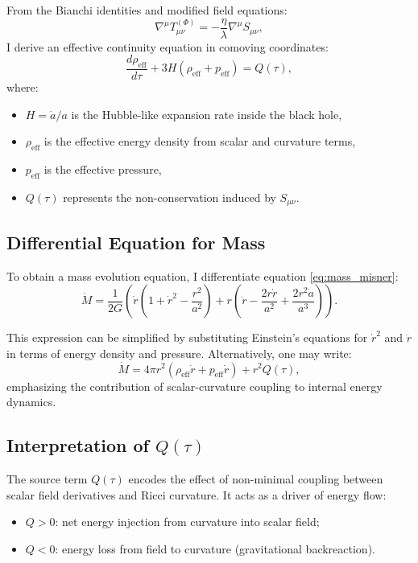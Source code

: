 \documentclass[12pt]{article}
\begin{document}
From the Bianchi identities and modified field equations:
\begin{equation}
\nabla^\mu T^{(\Phi)}_{\mu\nu} = -\frac{\eta}{\lambda} \nabla^\mu S_{\mu\nu},
\end{equation}
I derive an effective continuity equation in comoving coordinates:
\begin{equation}
\frac{d\rho_{\text{eff}}}{d\tau} + 3H(\rho_{\text{eff}} + p_{\text{eff}}) = Q(\tau),
\label{eq:modified_continuity}
\end{equation}
where:
\begin{itemize}
    \item \( H = \dot{a}/a \) is the Hubble-like expansion rate inside the black hole,
    \item \( \rho_{\text{eff}} \) is the effective energy density from scalar and curvature terms,
    \item \( p_{\text{eff}} \) is the effective pressure,
    \item \( Q(\tau) \) represents the non-conservation induced by \( S_{\mu\nu} \).
\end{itemize}

\subsection{Differential Equation for Mass}

To obtain a mass evolution equation, I differentiate equation \eqref{eq:mass_misner}:
\begin{equation}
\dot{M} = \frac{1}{2G} \left( \dot{r}(1 + \dot{r}^2 - \frac{r^2}{a^2}) + r(\ddot{r} - \frac{2r\dot{r}}{a^2} + \frac{2r^2 \dot{a}}{a^3}) \right).
\end{equation}

This expression can be simplified by substituting Einstein's equations for \( \dot{r}^2 \) and \( \ddot{r} \) in terms of energy density and pressure. Alternatively, one may write:
\begin{equation}
\dot{M} = 4\pi r^2 \left( \rho_{\text{eff}} \dot{r} + p_{\text{eff}} \dot{r} \right) + r^2 Q(\tau),
\end{equation}
emphasizing the contribution of scalar-curvature coupling to internal energy dynamics.

\subsection{Interpretation of \( Q(\tau) \)}

The source term \( Q(\tau) \) encodes the effect of non-minimal coupling between scalar field derivatives and Ricci curvature. It acts as a driver of energy flow:
\begin{itemize}
    \item \( Q > 0 \): net energy injection from curvature into scalar field;
    \item \( Q < 0 \): energy loss from field to curvature (gravitational backreaction).
\end{itemize}
\end{document}
